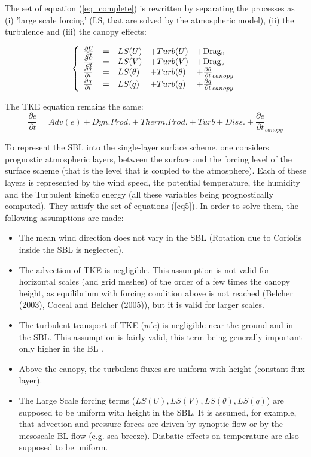 The set of equation (\ref{eq_complete}) is rewritten by separating the processes as (i) 'large scale forcing' (LS, that are solved by the atmospheric model), (ii) the turbulence and (iii) the canopy effects:

\begin{equation}
\left\{
\begin{array}{lllllll}
\frac{\partial U}{\partial t} &=&LS(U)& + Turb(U) & + {\rm Drag_u} \\
\frac{\partial V}{\partial t} &=&LS(V)& + Turb(V) & + {\rm Drag_v}\\
\frac{\partial \theta}{\partial t} &=&LS(\theta)&  + Turb(\theta) & + \frac{\partial \theta}{\partial t}_{canopy}\\
\frac{\partial q}{\partial t} &=&LS(q)&  + Turb(q) & + \frac{\partial q}{\partial t}_{canopy} \\
\end{array}
\right.\label{eq5}
\end{equation}

The TKE equation remains the same:
\begin{equation}
\frac{\partial e}{\partial t} =Adv(e) + Dyn. Prod. + Therm. Prod. + Turb  + Diss. + \frac{\partial e}{\partial t}_{canopy}
\end{equation}

To represent the SBL into the single-layer surface scheme, one considers prognostic atmospheric layers, between the surface and the forcing level of the surface scheme (that is the level that is coupled to the atmosphere). Each of these layers is represented by the wind speed, the potential temperature, the humidity and the Turbulent kinetic energy (all these variables being prognostically computed). They satisfy the set of equations (\ref {eq5}). In order to solve them, the following assumptions are made:
\begin{itemize}
\item The mean wind direction does not vary in the SBL (Rotation due to Coriolis inside the SBL is neglected).
\item The advection of TKE is negligible. This assumption is not valid for horizontal scales (and grid meshes) of the order of a few times the canopy height, as equilibrium with forcing condition above is not reached (Belcher \etal (2003)\nocite{Belcher2003}, Coceal and Belcher (2005)\nocite{Coceal2005}), but it is valid for larger scales.
\item The turbulent transport of TKE ($\overline{w'e}$) is negligible near the ground and in the SBL. This assumption is fairly valid, this term being generally important only higher in the BL .
\item Above the canopy, the turbulent fluxes are uniform with height (constant flux layer).
\item The Large Scale forcing terms ($LS(U), LS(V), LS(\theta), LS(q)$) are supposed to be uniform with height in the SBL. It is assumed, for example, that advection and pressure forces are driven by synoptic flow or by the mesoscale BL flow (e.g. sea breeze). Diabatic effects on temperature are also supposed to be uniform.
\end{itemize}

